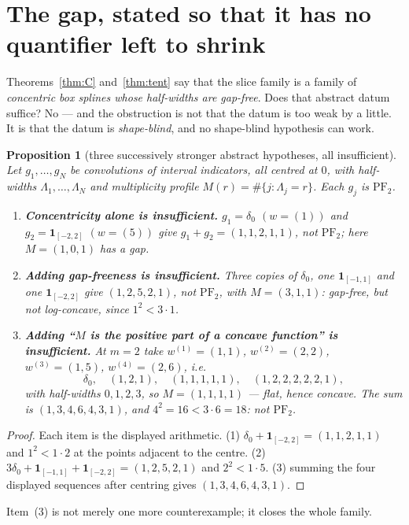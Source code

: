 \documentclass[11pt]{article}
\newtheorem{proposition}[theorem]{Proposition}
\theoremstyle{definition}
\newcommand{\PFtwo}{\mathrm{PF}_2}
\begin{document}
\section{The gap, stated so that it has no quantifier left to shrink}\label{sec:gap}

Theorems~\ref{thm:C} and~\ref{thm:tent} say that the slice family is a family of
\emph{concentric box splines whose half-widths are gap-free}. Does that abstract datum
suffice? No --- and the obstruction is not that the datum is too weak by a little. It is
that the datum is \emph{shape-blind}, and no shape-blind hypothesis can work.

\begin{proposition}[three successively stronger abstract hypotheses, all insufficient]\label{prop:abs}
Let $g_1,\dots,g_N$ be convolutions of interval indicators, all centred at $0$, with
half-widths $\Lambda_1,\dots,\Lambda_N$ and multiplicity profile $M(r)=\#\{j:\Lambda_j=r\}$.
Each $g_j$ is $\PFtwo$.
\begin{enumerate}
\item \textbf{Concentricity alone is insufficient.} $g_1=\delta_0$ $(w=(1))$ and
$g_2=\mathbf 1_{[-2,2]}$ $(w=(5))$ give $g_1+g_2=(1,1,2,1,1)$, not $\PFtwo$; here
$M=(1,0,1)$ has a gap.
\item \textbf{Adding gap-freeness is insufficient.} Three copies of $\delta_0$, one
$\mathbf 1_{[-1,1]}$ and one $\mathbf 1_{[-2,2]}$ give $(1,2,5,2,1)$, not $\PFtwo$, with
$M=(3,1,1)$: gap-free, but not log-concave, since $1^2<3\cdot1$.
\item \textbf{Adding ``$M$ is the positive part of a concave function'' is insufficient.}
At $m=2$ take $w^{(1)}=(1,1)$, $w^{(2)}=(2,2)$, $w^{(3)}=(1,5)$, $w^{(4)}=(2,6)$, i.e.
\[
  \delta_0,\quad (1,2,1),\quad (1,1,1,1,1),\quad (1,2,2,2,2,2,1),
\]
with half-widths $0,1,2,3$, so $M=(1,1,1,1)$ --- flat, hence concave. The sum is
$(1,3,4,6,4,3,1)$, and $4^2=16<3\cdot6=18$: not $\PFtwo$.
\end{enumerate}
\end{proposition}
\begin{proof}
Each item is the displayed arithmetic. (1) $\delta_0+\mathbf 1_{[-2,2]}=(1,1,2,1,1)$ and
$1^2<1\cdot2$ at the points adjacent to the centre. (2)
$3\delta_0+\mathbf 1_{[-1,1]}+\mathbf 1_{[-2,2]}=(1,2,5,2,1)$ and $2^2<1\cdot5$. (3) summing
the four displayed sequences after centring gives $(1,3,4,6,4,3,1)$.
\end{proof}

Item~(3) is not merely one more counterexample; it closes the whole family.
\end{document}

